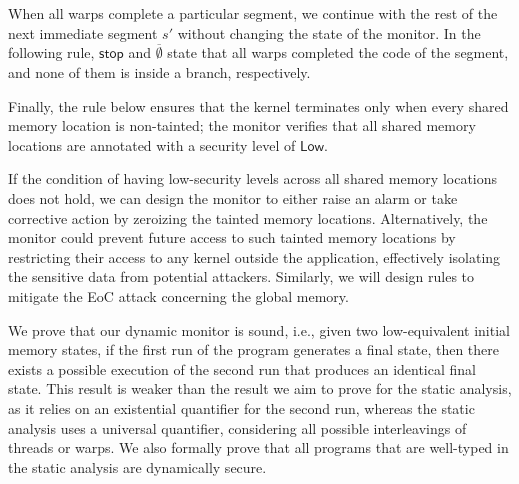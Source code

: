 When all warps complete a particular segment, we continue with the rest of the next immediate segment $s'$ without changing the state of the monitor. In the following rule, $\mathsf{stop}$ and $\overline{\emptyset}$ state that all warps completed the code of the segment, and none of them is inside a branch, respectively. 
{\small \begin{mathpar}
\end{mathpar}
}
Finally, the rule below ensures that the kernel terminates only when every shared memory location is non-tainted; the monitor verifies that all shared memory locations are annotated with a security level of $\mathsf{Low}$.

{\small\begin{mathpar}
\end{mathpar}
}

If the condition of having low-security levels across all shared memory locations does not hold, we can design the monitor to either raise an alarm or take corrective action by zeroizing the tainted memory locations. 
%
Alternatively, the monitor could prevent future access to such tainted memory locations by restricting their access to any kernel outside the application, effectively isolating the sensitive data from potential attackers.
%
Similarly, we will design rules to mitigate the EoC attack concerning the global memory.


We prove that our dynamic monitor is sound, i.e., given two low-equivalent initial memory states, if the first run of the program generates a final state, then there exists a possible execution of the second run that produces an identical final state. 
%
This result is weaker than the result we aim to prove for the static analysis, as it relies on an existential quantifier for the second run, whereas the static analysis uses a universal quantifier, considering all possible interleavings of threads or warps.
%
We also formally prove that all programs that are well-typed in the static analysis are dynamically secure.

